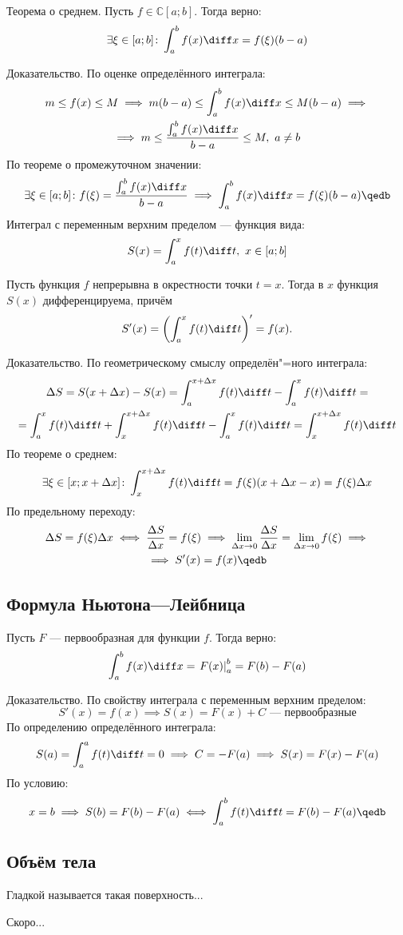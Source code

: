 \begin{theorem}
{\bold Теорема о среднем.} Пусть $f\in\mathbb{C}[a;b]$. Тогда верно:
$$\exists\xi\in[a;b]\colon\int_a^bf(x)\diff x=f(\xi)(b-a)$$
\end{theorem}
{\bold Доказательство.} По оценке определённого интеграла:
\begin{gather*}
m\leq f(x)\leq M\implies m(b-a)\leq\int_a^bf(x)\diff x\leq M(b-a)\implies\\
\implies m\leq\frac{\int_a^bf(x)\diff x}{b-a}\leq M,\ a\neq b
\end{gather*}
По теореме о промежуточном значении:
$$\exists\xi\in[a;b]\colon f(\xi)=\frac{\int_a^bf(x)\diff x}{b-a}\implies\int_a^bf(x)\diff x=f(\xi)(b-a)\qedb$$
{\bold Интеграл с переменным верхним пределом} --- функция вида:
$$S(x)=\int_a^xf(t)\diff t,\ x\in[a;b]$$
\begin{theorem}
Пусть функция $f$ непрерывна в окрестности точки $t=x$. Тогда в $x$ функция $S(x)$ дифференцируема, причём
$$S'(x)=\left(\int_a^xf(t)\diff t\right)'=f(x).$$
\end{theorem}
{\bold Доказательство.} По геометрическому смыслу определён"=ного интеграла:
\begin{gather*}
\Delta S=S(x+\Delta x)-S(x)=\int_a^{x+\Delta x}f(t)\diff t-\int_a^xf(t)\diff t=\\
=\int_a^xf(t)\diff t+\int_x^{x+\Delta x}f(t)\diff t-\int_a^xf(t)\diff t=\int_x^{x+\Delta x}f(t)\diff t
\end{gather*}
По теореме о среднем:
$$\exists\xi\in[x;x+\Delta x]\colon\int_x^{x+\Delta x}f(t)\diff t=f(\xi)(x+\Delta x-x)=f(\xi)\Delta x$$
По предельному переходу:
\begin{gather*}
\Delta S=f(\xi)\Delta x\iff\frac{\Delta S}{\Delta x}=f(\xi)\implies\lim_{\Delta x\to 0}\frac{\Delta S}{\Delta x}=\lim_{\Delta x\to 0}f(\xi)\implies\\
\implies S'(x)=f(x)\qedb
\end{gather*}

\subsection{Формула Ньютона—Лейбница}

\begin{theorem}
Пусть $F$ --- первообразная для функции $f$. Тогда верно:
$$\int_a^bf(x)\diff x=\left.F(x)\right\rvert_a^b=F(b)-F(a)$$
\end{theorem}
{\bold Доказательство.} По свойству интеграла с переменным верхним пределом:
$$S'(x)=f(x)\implies S(x)=F(x)+C\text{ --- первообразные}$$
По определению определённого интеграла:
$$S(a)=\int_a^af(t)\diff t=0\implies C=-F(a)\implies S(x)=F(x)-F(a)$$
По условию:
$$x=b\implies S(b)=F(b)-F(a)\iff\int_a^bf(t)\diff t=F(b)-F(a)\qedb$$

\subsection{Объём тела}

{\bold Гладкой} называется такая поверхность...

Скоро...
